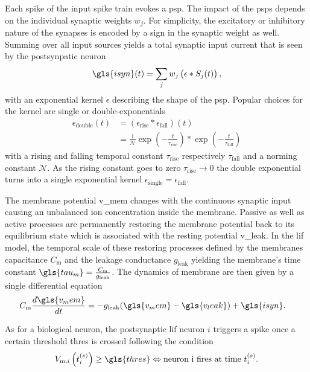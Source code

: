 Each spike of the input spike train evokes a \gls{psp}. The impact of the \glspl{psp} depends on the individual synaptic weights $w_j$. For simplicity, the excitatory or inhibitory nature of the synapses is encoded by a sign in the synaptic weight as well. Summing over all input sources yields a total synaptic input current that is seen by the postsynpatic neuron
\begin{equation}
\gls{isyn}(t) = \sum_j w_j \left(\epsilon \ast S_j(t)\right),
\label{synpatic_input}
\end{equation}
with an exponential kernel $\epsilon$ describing the shape of the \gls{psp}. Popular choices for the kernel are single or double-exponentials
\begin{align}
\epsilon_\text{double}(t) 	&= \left(\epsilon_\text{rise} \ast \epsilon_\text{fall}\right)(t) \\
							&=\frac{1}{\mathcal{N}}\exp \left(-\frac{t}{\tau_\text{rise}} \right)  \ast \exp \left(-\frac{t}{\tau_\text{fall}} \right) 
\label{exponentialkernels)}
\end{align}
with a rising and falling temporal constant $\tau_\text{rise}$ respectively $\tau_\text{fall}$ and a norming constant $\mathcal{N}$. As the rising constant goes to zero $\tau_\text{rise} \rightarrow 0$ the double exponential turns into a single exponential kernel $\epsilon_\text{single} = \epsilon_\text{fall}$.

The membrane potential \gls{v_mem} changes with the continuous synaptic input causing an unbalanced ion concentration inside the membrane. Passive as well as active processes are permanently restoring the membrane potential back to its equilibrium state which is associated with the resting potential \gls{v_leak}. In the \gls{lif} model, the temporal scale of these restoring processes defined by the membranes capacitance $C_\text{m}$ and the leakage conductance $g_\text{leak}$ yielding the membrane's time constant $\gls{tau_m} = \frac{C_\text{m}}{g_\text{leak}}$. The dynamics of membrane are then given by a single differential equation
\begin{align}
\label{lifeq}
C_{\text{m}} \frac{d\gls{v_mem}}{dt} &= -g_{\text{leak}} (\gls{v_mem} - \gls{v_leak}) + \gls{isyn}.
\end{align}

As for a biological neuron, the postsynaptic \gls{lif} neuron $i$ triggers a spike once a certain threshold \gls{thres} is crossed following the condition
\begin{equation}
V_{\text{m}, i}\left(t_i^{(s)}\right) \ge \gls{thres} \Leftrightarrow \text{neuron i fires at time } t_i^{(s)}.
\end{equation}

